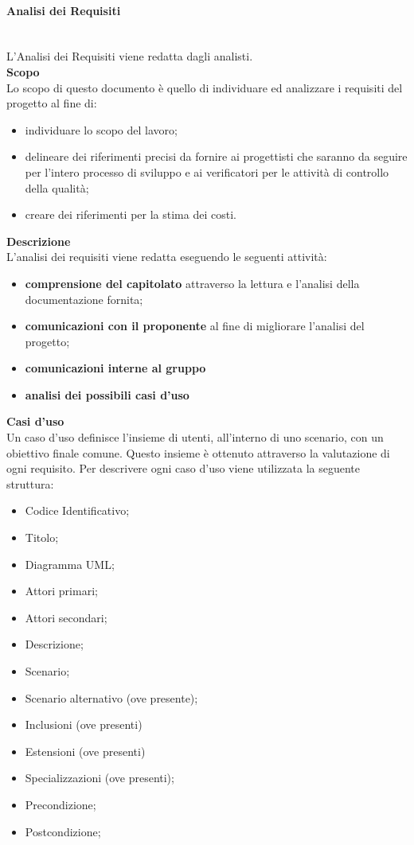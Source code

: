 \paragraph{Analisi dei Requisiti} \mbox{}
\\L'Analisi dei Requisiti viene redatta dagli analisti.
\\ \textbf{Scopo}\\ 
Lo scopo di questo documento è quello di individuare ed analizzare i requisiti del progetto al fine di:
\begin{itemize}
	\item individuare lo scopo del lavoro;
	\item delineare dei riferimenti precisi da fornire ai progettisti che saranno da seguire per l'intero processo di sviluppo e ai verificatori per le attività di controllo della qualità;
	\item creare dei riferimenti per la stima dei costi.
\end{itemize}
\textbf{Descrizione}\\
L'analisi dei requisiti viene redatta eseguendo le seguenti attività:
\begin{itemize}
	\item \textbf{comprensione del capitolato\glo} attraverso la lettura e l'analisi della documentazione fornita;
	\item \textbf{comunicazioni con il proponente} al fine di migliorare l'analisi del progetto;
	\item \textbf{comunicazioni interne al gruppo}
	\item \textbf{analisi dei possibili casi d'uso}
\end{itemize}
\textbf{Casi d'uso}\\
Un caso d'uso definisce l'insieme di utenti, all'interno di uno scenario, con un obiettivo finale comune. Questo insieme è ottenuto attraverso la valutazione di ogni requisito.
Per descrivere ogni caso d'uso viene utilizzata la seguente struttura:
\begin{itemize}
	\item Codice Identificativo;
	\item Titolo;
	\item Diagramma UML;
	\item Attori primari;
	\item Attori secondari;
	\item Descrizione;
	\item Scenario;
	\item Scenario alternativo (ove presente);
	\item Inclusioni (ove presenti)
	\item Estensioni (ove presenti)
	\item Specializzazioni (ove presenti);
	\item Precondizione;
	\item Postcondizione;	
\end{itemize}
